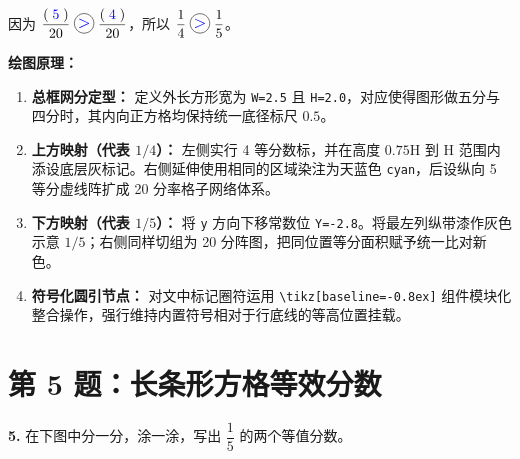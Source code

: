 \begin{center}

\vspace{0.8cm}
{\Large 因为 $\dfrac{(\;\textcolor{blue}{5}\;)}{20} \;\tikz[baseline=-0.8ex] \node[circle, draw, inner sep=1pt, minimum size=1.4em, font=\large] {\textcolor{blue}{$>$}};\; \dfrac{(\;\textcolor{blue}{4}\;)}{20}$，所以 $\dfrac{1}{4} \;\tikz[baseline=-0.8ex] \node[circle, draw, inner sep=1pt, minimum size=1.4em, font=\large] {\textcolor{blue}{$>$}};\; \dfrac{1}{5}$。}
\end{center}

\vspace{0.5cm}
\textbf{绘图原理：}
\begin{enumerate}
    \item \textbf{总框网分定型：} 定义外长方形宽为 \texttt{W=2.5} 且 \texttt{H=2.0}，对应使得图形做五分与四分时，其内向正方格均保持统一底径标尺 $0.5$。
    \item \textbf{上方映射（代表 $1/4$）：} 左侧实行 4 等分数标，并在高度 $0.75\text{H}$ 到 $\text{H}$ 范围内添设底层灰标记。右侧延伸使用相同的区域染注为天蓝色 \texttt{cyan}，后设纵向 5 等分虚线阵扩成 20 分率格子网络体系。
    \item \textbf{下方映射（代表 $1/5$）：} 将 \texttt{y} 方向下移常数位 \texttt{Y=-2.8}。将最左列纵带漆作灰色示意 $1/5$；右侧同样切组为 20 分阵图，把同位置等分面积赋予统一比对新色。
    \item \textbf{符号化圆引节点：} 对文中标记圈符运用 \texttt{\textbackslash tikz[baseline=-0.8ex]} 组件模块化整合操作，强行维持内置符号相对于行底线的等高位置挂载。
\end{enumerate}

\vspace{1.5cm}

\section*{第 5 题：长条形方格等效分数}

\textbf{5.} 在下图中分一分，涂一涂，写出 $\dfrac{1}{5}$ 的两个等值分数。

